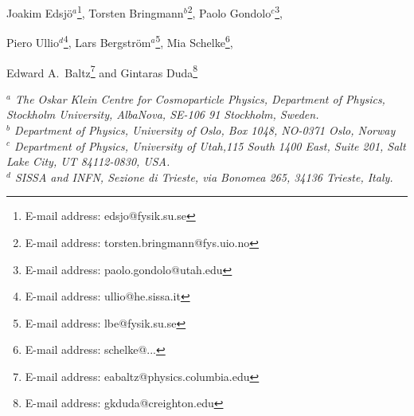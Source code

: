 
{\Large \bfseries
\centerline{
Joakim Edsj\"o$^a$\footnote{E-mail address: edsjo@fysik.su.se},
Torsten Bringmann$^b$\footnote{E-mail address: torsten.bringmann@fys.uio.no},
Paolo Gondolo$^c$\footnote{E-mail address: paolo.gondolo@utah.edu},}
\smallskip
\centerline{
Piero Ullio$^d$\footnote{E-mail address: ullio@he.sissa.it},
Lars Bergstr\"om$^a$\footnote{E-mail address: lbe@fysik.su.se},
Mia Schelke\footnote{E-mail address: schelke@...},}
\smallskip
\centerline{
Edward A.~Baltz\footnote{E-mail address: eabaltz@physics.columbia.edu} and
Gintaras Duda\footnote{E-mail address: gkduda@creighton.edu}}
}
\bigskip


\begin{centering}
\em 
{}$^a$ The Oskar Klein Centre for Cosmoparticle Physics, Department of Physics, 
   Stockholm University, AlbaNova, SE-106 91 Stockholm, Sweden.\\
\smallskip
{}$^b$ Department of Physics, University of Oslo, Box 1048, NO-0371 Oslo, Norway\\
\smallskip
{}$^c$ Department of Physics, University of Utah,115 South 1400 East, Suite 201, 
  Salt Lake City, UT 84112-0830, USA.\\
\smallskip
{}$^d$ SISSA and INFN, Sezione di Trieste, via Bonomea 265, 34136 Trieste, Italy.\\
%
\end{centering}

